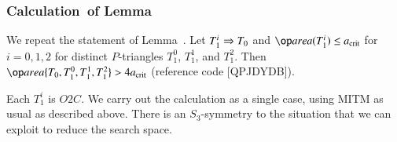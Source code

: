 \subsubsection{Calculation~of Lemma~} 

We repeat the statement of Lemma~.  Let $T_1^i\Rightarrow T_0$
and $\area(T_1^i)\le\acrit$ for $i=0,1,2$ for distinct $P$-triangles
$T_1^0$, $T_1^1$, and $T_1^2$.  Then $\area\{T_0,T_1^0,T_1^1,T_1^2\} >
4\acrit$ (reference code [QPJDYDB]).

Each $T_1^i$ is $O2C$.  We carry out the calculation as a single case,
using MITM as usual as described above.  There is an $S_3$-symmetry to
the situation that we can exploit to reduce the search space.

